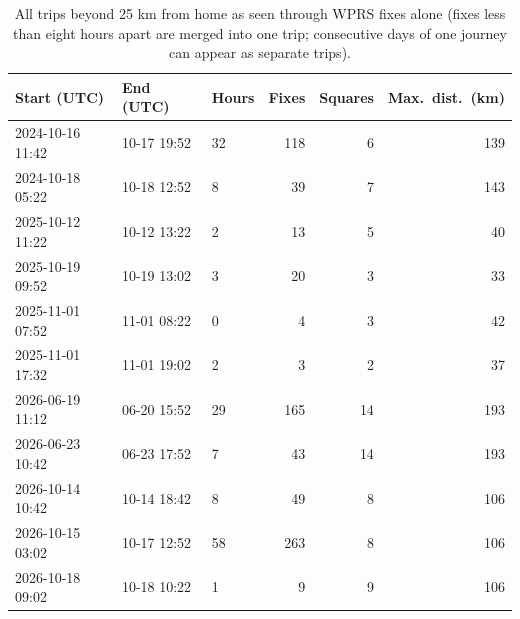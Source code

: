 \begin{table}[htbp]\centering\small
\caption{All trips beyond 25 km from home as seen through WPRS fixes alone (fixes less than eight hours apart are merged into one trip; consecutive days of one journey can appear as separate trips).}\label{tab:wtrips}
\begin{tabular}{lllrrr}
\toprule
Start (UTC) & End (UTC) & Hours & Fixes & Squares & Max.\ dist.\ (km) \\
\midrule
2024-10-16 11:42 & 10-17 19:52 & 32 & 118 & 6 & 139 \\
2024-10-18 05:22 & 10-18 12:52 & 8 & 39 & 7 & 143 \\
2025-10-12 11:22 & 10-12 13:22 & 2 & 13 & 5 & 40 \\
2025-10-19 09:52 & 10-19 13:02 & 3 & 20 & 3 & 33 \\
2025-11-01 07:52 & 11-01 08:22 & 0 & 4 & 3 & 42 \\
2025-11-01 17:32 & 11-01 19:02 & 2 & 3 & 2 & 37 \\
2026-06-19 11:12 & 06-20 15:52 & 29 & 165 & 14 & 193 \\
2026-06-23 10:42 & 06-23 17:52 & 7 & 43 & 14 & 193 \\
2026-10-14 10:42 & 10-14 18:42 & 8 & 49 & 8 & 106 \\
2026-10-15 03:02 & 10-17 12:52 & 58 & 263 & 8 & 106 \\
2026-10-18 09:02 & 10-18 10:22 & 1 & 9 & 9 & 106 \\
\bottomrule
\end{tabular}
\end{table}
